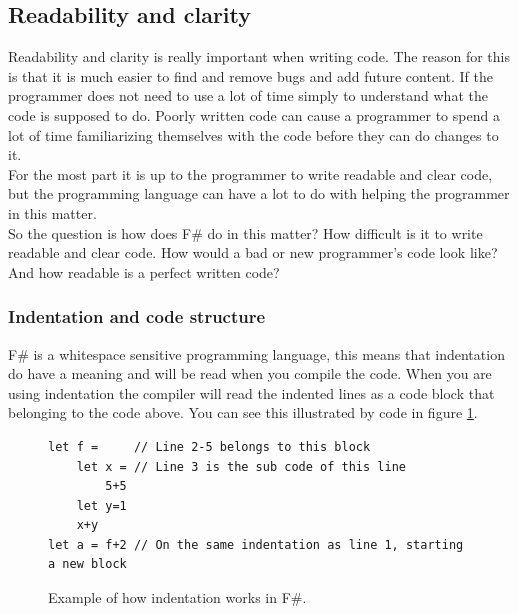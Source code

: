 \documentclass[12pt, a4paper]{article}
\begin{document}



\subsection{Readability and clarity}
Readability and clarity is really important when writing code. The reason for this is that it is much easier to find and remove bugs and add future content. If the programmer does not need to use a lot of time simply to understand what the code is supposed to do. Poorly written code can cause a programmer to spend a lot of time familiarizing themselves with the code before they can do changes to it.\\

For the most part it is up to the programmer to write readable and clear code, but the programming language can have a lot to do with helping the programmer in this matter.\\


So the question is how does F\# do in this matter? How difficult is it to write readable and clear code. How would a bad or new programmer's code look like? And how readable is a perfect written code?

\newpage
\subsubsection{Indentation and code structure}
\label{indentationAndCodeStructure}
F\# is a whitespace sensitive programming language, this means that indentation do have a meaning and will be read when you compile the code. When you are using indentation the compiler will read the indented lines as a code block that belonging to the code above. You can see this illustrated by code in figure \ref{fig:indentationExample}.

\begin{figure}[!h]
	\begin{lstlisting}
let f = 	// Line 2-5 belongs to this block
	let x = // Line 3 is the sub code of this line
		5+5	
	let y=1
  	x+y
let a = f+2	// On the same indentation as line 1, starting a new block
	\end{lstlisting}
	\caption{Example of how indentation works in F\#.}
	\label{fig:indentationExample}
\end{figure}
\end{document}
